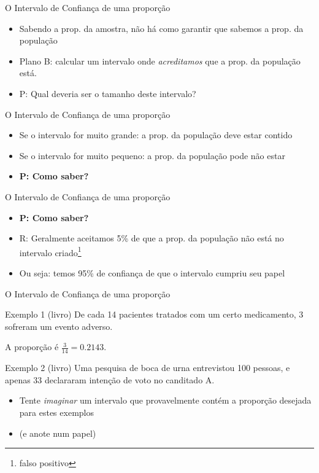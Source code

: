 \documentclass{beamer}
\begin{document}
\begin{frame}{O Intervalo de Confiança de uma proporção}
  \begin{itemize}
    \footnotesize
  \item Sabendo a prop. da amostra, não há como garantir que sabemos a prop. da população
  \item Plano B: calcular um intervalo onde {\em acreditamos} que a prop. da população está.
  \item P: Qual deveria ser o tamanho deste intervalo?
  \end{itemize}
\end{frame}

\begin{frame}{O Intervalo de Confiança de uma proporção}
  \begin{itemize}
    \footnotesize
  \item<1,3> Se o intervalo for muito grande: a prop. da população deve estar contido
  \item<2,3> Se o intervalo for muito pequeno: a prop. da população pode não estar
  \item<3> {\bf P: Como saber?}
  \end{itemize}
\end{frame}

\begin{frame}{O Intervalo de Confiança de uma proporção}
  \begin{itemize}
    \footnotesize
  \item {\bf P: Como saber?}
  \item R: Geralmente aceitamos 5\% de que a prop. da população não está no intervalo criado\footnote{\scriptsize falso positivo}
  \item Ou seja: temos \alert{95\% de confiança} de que o intervalo cumpriu seu papel
  \end{itemize}
\end{frame}

\begin{frame}{O Intervalo de Confiança de uma proporção}
  \begin{exampleblock}{Exemplo 1 (livro)}
    \footnotesize
    De cada 14 pacientes tratados com um certo medicamento, 3 sofreram um evento adverso.

    A proporção é $\frac{3}{14} = 0.2143$.
  \end{exampleblock}
    \begin{exampleblock}{Exemplo 2 (livro)}
    \footnotesize
    Uma pesquisa de boca de urna entrevistou 100 pessoas, e apenas 33 declararam intenção de voto no canditado A.

  \end{exampleblock}
  \begin{itemize}
    \footnotesize
    \item Tente {\em imaginar} um intervalo que \alert{provavelmente contém} a proporção desejada para estes exemplos
    \item (e anote num papel)
  \end{itemize}
\end{frame}
\end{document}
